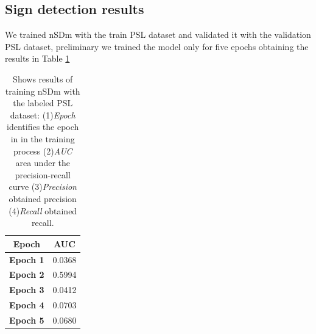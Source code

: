 \documentclass[twocolumn,conference]{article}
\begin{document}
\subsection{Sign detection results}
We trained nSDm with the train PSL dataset and validated it with the validation PSL dataset, preliminary we trained the model only for five epochs obtaining the results in Table \ref{tab:signs-detection-results}
\begin{table}[!htb]
\captionsetup{font=footnotesize}
\centering
\begin{tabular}{ p{16em} c }
\toprule
\multicolumn{1}{c}{\textbf{Epoch}} & 
	\multicolumn{1}{c}{\textbf{AUC}}\\
\midrule
\textbf{Epoch 1}&	0.0368\\
\textbf{Epoch 2}&	0.5994\\
\textbf{Epoch 3}&	0.0412\\
\textbf{Epoch 4}&	0.0703\\
\textbf{Epoch 5}&	0.0680\\
\bottomrule
\end{tabular}
\caption{Shows results of training nSDm with the labeled PSL dataset: (1)\textit{Epoch} identifies the epoch in in the training process (2)\textit{AUC} area under the precision-recall curve (3)\textit{Precision} obtained precision (4)\textit{Recall} obtained recall.}
\label{tab:signs-detection-results}
\end{table}
\end{document}
